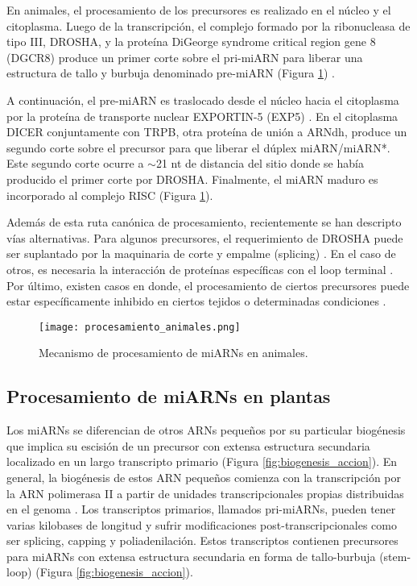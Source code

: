 En animales, el procesamiento de los precursores es realizado en el núcleo y el citoplasma.
Luego de la transcripción, el complejo formado por la ribonucleasa de tipo III, DROSHA, y la proteína DiGeorge syndrome critical region gene 8 (DGCR8) produce un primer corte sobre el pri-miARN para liberar una estructura de tallo y burbuja denominado pre-miARN (Figura \ref{fig:procesamiento_animales}) \citep{pmid15531879, pmid15531877, pmid15574589, pmid15932881}.

A continuación, el pre-miARN es traslocado desde el núcleo hacia el citoplasma por la proteína de transporte nuclear EXPORTIN-5 (EXP5) \citep{pmid14631048,pmid14681208}.
En el citoplasma DICER conjuntamente con TRPB, otra proteína de unión a ARNdh, produce un segundo corte sobre el precursor para que liberar el dúplex miARN/miARN*.
Este segundo corte ocurre a $\sim$21 nt de distancia del sitio donde se había producido el primer corte por DROSHA.
Finalmente, el miARN maduro es incorporado al complejo RISC \citep{pmid19165215} (Figura \ref{fig:procesamiento_animales}).

Además de esta ruta canónica de procesamiento, recientemente se han descripto vías alternativas.
Para algunos precursores, el requerimiento de DROSHA puede ser suplantado por la maquinaria de corte y empalme (splicing) \citep{pmid17599402,pmid17589500}.
En el caso de otros, es necesaria la interacción de proteínas específicas con el loop terminal \citep{pmid17558416,pmid19458619}.
Por último, existen casos en donde, el procesamiento de ciertos precursores puede estar específicamente inhibido en ciertos tejidos o determinadas condiciones \citep{pmid18951094,pmid16738409,pmid18292307}.

\begin{figure}[htbp!] 
    \centering    
    \texttt{[image: procesamiento\_animales.png]}
    \caption[Biogénesis de miARNs en animales]{Mecanismo de procesamiento de miARNs en animales.}
    \label{fig:procesamiento_animales}
\end{figure}


\subsection{Procesamiento de miARNs en plantas}

Los miARNs se diferencian de otros ARNs pequeños por su particular biogénesis que implica su escisión de un precursor con extensa estructura secundaria localizado en un largo transcripto primario (Figura \ref{fig:biogenesis_accion}).
En general, la biogénesis de estos ARN pequeños comienza con la transcripción por la ARN polimerasa II \citep{Xie2005a} a partir de unidades transcripcionales propias distribuidas en el genoma \citep{Reinhart2002}.
Los transcriptos primarios, llamados pri-miARNs, pueden tener varias kilobases de longitud y sufrir modificaciones post-transcripcionales como ser splicing, capping y poliadenilación. 
Estos transcriptos contienen precursores para miARNs con extensa estructura secundaria en forma de tallo-burbuja (stem-loop) \citep{Jones-Rhoades2006} (Figura \ref{fig:biogenesis_accion}).

